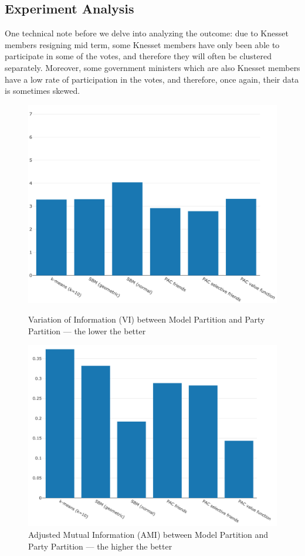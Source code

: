 \documentclass[letterpaper]{article} %
\theoremstyle{definition}
\begin{document}
\subsection{Experiment Analysis} \label{subsec:exp_analysis}

One technical note before we delve into analyzing the outcome: due to Knesset members resigning mid term, some Knesset members have only been able to participate in some of the votes, and therefore they will often be clustered separately. Moreover, some government ministers which are also Knesset members have a low rate of participation in the votes, and therefore, once again, their data is sometimes skewed.

\begin{figure}[htb]
\includegraphics[width=.8\columnwidth]{AAAITemplate/exp_vi.png}
\caption{Variation of Information (VI) between Model Partition and Party Partition --- the lower the better}

\includegraphics[width=.8\columnwidth]{AAAITemplate/exp_ami.png}
\caption{Adjusted Mutual Information (AMI) between Model Partition and Party Partition --- the higher the better}
\end{figure}
\end{document}
